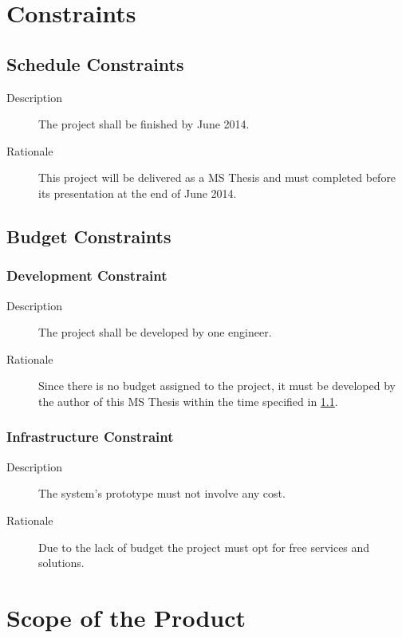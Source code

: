 \section{Constraints} \label{constraints}
\subsection{Schedule Constraints} \label{schedule_constraint}

\begin{description}
\item[Description] The project shall be finished by June 2014.
\item[Rationale] This project will be delivered as a MS Thesis and must completed before its presentation at the end of June 2014.
\end{description}

\subsection{Budget Constraints}

\subsubsection{Development Constraint}

\begin{description}
\item[Description] The project shall be developed by one engineer.
\item[Rationale] Since there is no budget assigned to the project, it must be developed by the author of this MS Thesis within the time specified in \ref{schedule_constraint}.
\end{description}

\subsubsection{Infrastructure Constraint}

\begin{description}
\item[Description] The system's prototype must not involve any cost.
\item[Rationale] Due to the lack of budget the project must opt for free services and solutions.
\end{description}

\section{Scope of the Product}

